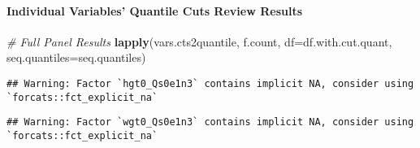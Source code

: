 \documentclass[
]{book}
\newenvironment{Shaded}{\begin{snugshade}}{\end{snugshade}}
\newcommand{\CommentTok}[1]{\textcolor[rgb]{0.56,0.35,0.01}{\textit{#1}}}
\newcommand{\ControlFlowTok}[1]{\textcolor[rgb]{0.13,0.29,0.53}{\textbf{#1}}}
\newcommand{\DataTypeTok}[1]{\textcolor[rgb]{0.13,0.29,0.53}{#1}}
\newcommand{\KeywordTok}[1]{\textcolor[rgb]{0.13,0.29,0.53}{\textbf{#1}}}
\newcommand{\NormalTok}[1]{#1}
\newcommand{\OperatorTok}[1]{\textcolor[rgb]{0.81,0.36,0.00}{\textbf{#1}}}
\newcommand{\StringTok}[1]{\textcolor[rgb]{0.31,0.60,0.02}{#1}}
\begin{document}
\hypertarget{individual-variables-quantile-cuts-review-results}{%
\paragraph{Individual Variables' Quantile Cuts Review Results}\label{individual-variables-quantile-cuts-review-results}}

\begin{Shaded}
\end{Shaded}

\begin{Shaded}
\begin{Highlighting}[]
\CommentTok{# Full Panel Results}
\KeywordTok{lapply}\NormalTok{(vars.cts2quantile, f.count, }\DataTypeTok{df=}\NormalTok{df.with.cut.quant, }\DataTypeTok{seq.quantiles=}\NormalTok{seq.quantiles)}
\end{Highlighting}
\end{Shaded}

\begin{verbatim}
## Warning: Factor `hgt0_Qs0e1n3` contains implicit NA, consider using `forcats::fct_explicit_na`
\end{verbatim}

\begin{verbatim}
## Warning: Factor `wgt0_Qs0e1n3` contains implicit NA, consider using `forcats::fct_explicit_na`
\end{verbatim}
\end{document}
